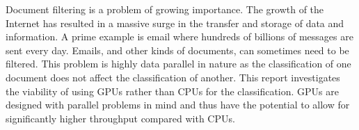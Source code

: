 Document filtering is a problem of growing importance. The growth of the
Internet has resulted in a massive surge in the transfer and storage of data and
information. A prime example is email where hundreds of billions of messages
are sent every day. Emails, and other kinds of documents, can sometimes need to
be filtered. This problem is highly data parallel in nature as the
classification of one document does not affect the classification of another.
This report investigates the viability of using GPUs rather than CPUs for the
classification. GPUs are designed with parallel problems in mind and thus have
the potential to allow for significantly higher throughput compared with CPUs.
